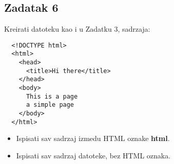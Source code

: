\documentclass[12pt,a4paper]{article}
\begin{document}
	\subsection*{Zadatak 6}
  Kreirati datoteku kao i u Zadatku 3, sadrzaja:
	\begin{verbatim}
  <!DOCTYPE html>
  <html>
    <head>
      <title>Hi there</title>
    </head>
    <body>
      This is a page
      a simple page
    </body>
  </html>
	\end{verbatim}
	\begin{itemize}
    \item Ispisati sav sadrzaj izmedu HTML oznake \textbf{html}.
    \item Ispisati sav sadrzaj datoteke, bez HTML oznaka.
	\end{itemize}
\end{document}

